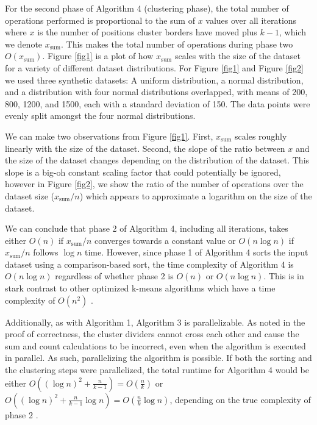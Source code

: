 \documentclass[conference,compsoc]{IEEEtran}
\begin{document}
For the second phase of Algorithm 4 (clustering phase), the total number of operations performed is proportional to the sum of $x$ values over all iterations where $x$ is the number of positions cluster borders have moved plus $k-1$, which we denote $x_\text{sum}$. This makes the total number of operations during phase two $O(x_\text{sum})$. Figure \ref{fig1} is a plot of how $x_\text{sum}$ scales with the size of the dataset for a variety of different dataset distributions. For Figure \ref{fig1} and Figure \ref{fig2} we used three synthetic datasets: A uniform distribution, a normal distribution, and a distribution with four normal distributions overlapped, with means of 200, 800, 1200, and 1500, each with a standard deviation of 150. The data points were evenly split amongst the four normal distributions.

We can make two observations from Figure \ref{fig1}. First, $x_\text{sum}$ scales roughly linearly with the size of the dataset. Second, the slope of the ratio between $x$ and the size of the dataset changes depending on the distribution of the dataset. This slope is a big-oh constant scaling factor that could potentially be ignored, however in Figure \ref{fig2}, we show the ratio of the number of operations over the dataset size ($x_\text{sum}/n$) which appears to approximate a logarithm on the size of the dataset.

We can conclude that phase 2 of Algorithm 4, including all iterations, takes either $O(n)$ if $x_\text{sum}/n$ converges towards a constant value or $O(n \log n)$ if $x_\text{sum}/n$ follows $\log n$ time. However, since phase 1 of Algorithm 4 sorts the input dataset using a comparison-based sort, the time complexity of Algorithm 4 is $O(n \log n)$ regardless of whether phase 2 is $O(n)$ or $O(n \log n)$. This is in stark contrast to other optimized k-means algorithms which have a time complexity of $O(n^2)$ \cite{b1}.

Additionally, as with Algorithm 1, Algorithm 3 is parallelizable. As noted in the proof of correctness, the cluster dividers cannot cross each other and cause the sum and count calculations to be incorrect, even when the algorithm is executed in parallel. As such, parallelizing the algorithm is possible. If both the sorting and the clustering steps were parallelized, the total runtime for Algorithm 4 would be either $O((\log n)^2 + \frac{n}{k-1}) = O(\frac{n}{k})$ or $O((\log n)^2 + \frac{n}{k-1} \log n) = O(\frac{n}{k} \log n)$, depending on the true complexity of phase 2 \cite{b6}.
\end{document}
